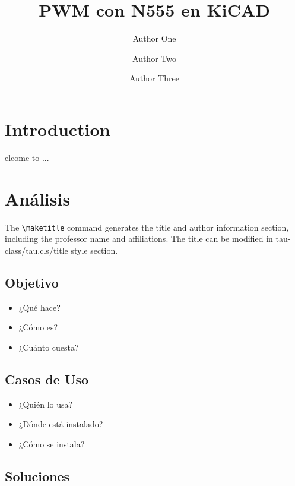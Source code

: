 \documentclass[9pt,a4paper,twocolumn,twoside]{tau-class/tau}
\title{PWM con N555 en KiCAD}
\author[a,1]{Author One}
\author[b,2]{Author Two}
\author[b,c,3]{Author Three}
\affil[a]{Affiliation of author one}
\affil[b]{Affiliation of author two}
\affil[c]{Affiliation of author three}
\begin{document}
		
    \maketitle 
    \thispagestyle{firststyle} 
    \tauabstract 
    

\section{Introduction}

    elcome to ...

\section{Análisis}

    The \verb*|\maketitle| command generates the title and author information section, including the professor name and affiliations. The title can be modified in tau-class/tau.cls/title style section. 

    \subsection{Objetivo}
    
    \begin{itemize}
    		\item ¿Qué hace?
    		\item ¿Cómo es?
    		\item ¿Cuánto cuesta?
    \end{itemize}


    \subsection{Casos de Uso}
    
    \begin{itemize}
    		\item ¿Quién lo usa?
    		\item ¿Dónde está instalado?
    		\item ¿Cómo se instala?
    \end{itemize}

    \subsection{Soluciones}
    
\end{document}
